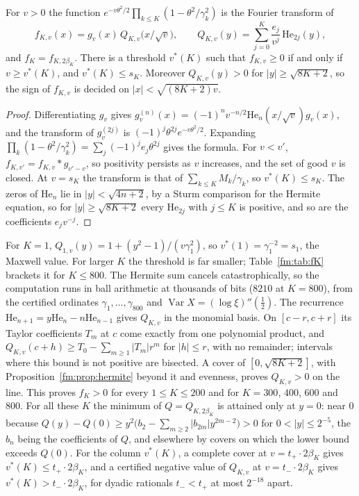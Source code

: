 \begin{proposition}\label{fm:prop:hermite}
For $v>0$ the function $e^{-v\theta^2/2}\prod_{k\le K}(1-\theta^2/\gamma_k^2)$ is the Fourier transform of
\[
f_{K,v}(x)=g_v(x)\,Q_{K,v}\big(x/\sqrt v\big),\qquad Q_{K,v}(y)=\sum_{j=0}^K\frac{e_j}{v^j}\,\mathrm{He}_{2j}(y),
\]
and $f_K=f_{K,2\beta_K}$. There is a threshold $v^*(K)$ such that $f_{K,v}\ge0$ if and only if $v\ge v^*(K)$, and $v^*(K)\le s_K$. Moreover $Q_{K,v}(y)>0$ for $|y|\ge\sqrt{8K+2}$, so the sign of $f_{K,v}$ is decided on $|x|<\sqrt{(8K+2)v}$.
\end{proposition}

\begin{proof}
Differentiating $g_v$ gives $g_v^{(n)}(x)=(-1)^nv^{-n/2}\mathrm{He}_n(x/\sqrt v)g_v(x)$, and the transform of $g_v^{(2j)}$ is $(-1)^j\theta^{2j}e^{-v\theta^2/2}$. Expanding $\prod_k(1-\theta^2/\gamma_k^2)=\sum_j(-1)^je_j\theta^{2j}$ gives the formula. For $v<v'$, $f_{K,v'}=f_{K,v}*g_{v'-v}$, so positivity persists as $v$ increases, and the set of good $v$ is closed. At $v=s_K$ the transform is that of $\sum_{k\le K}M_k/\gamma_k$, so $v^*(K)\le s_K$. The zeros of $\mathrm{He}_n$ lie in $|y|<\sqrt{4n+2}$, by a Sturm comparison for the Hermite equation, so for $|y|\ge\sqrt{8K+2}$ every $\mathrm{He}_{2j}$ with $j\le K$ is positive, and so are the coefficients $e_jv^{-j}$.
\end{proof}

For $K=1$, $Q_{1,v}(y)=1+(y^2-1)/(v\gamma_1^2)$, so $v^*(1)=\gamma_1^{-2}=s_1$, the Maxwell value. For larger $K$ the threshold is far smaller; Table~\ref{fm:tab:fK} brackets it for $K\le800$. The Hermite sum cancels catastrophically, so the computation runs in ball arithmetic \cite{Arb} at thousands of bits ($8210$ at $K=800$), from the certified ordinates $\gamma_1,\dots,\gamma_{800}$ and $\operatorname{Var}X=(\log\xi)''(\frac12)$. The recurrence $\mathrm{He}_{n+1}=y\mathrm{He}_n-n\mathrm{He}_{n-1}$ gives $Q_{K,v}$ in the monomial basis. On $[c-r,c+r]$ its Taylor coefficients $T_m$ at $c$ come exactly from one polynomial product, and $Q_{K,v}(c+h)\ge T_0-\sum_{m\ge1}|T_m|r^m$ for $|h|\le r$, with no remainder; intervals where this bound is not positive are bisected. A cover of $[0,\sqrt{8K+2}]$, with Proposition~\ref{fm:prop:hermite} beyond it and evenness, proves $Q_{K,v}>0$ on the line. This proves $f_K>0$ for every $1\le K\le200$ and for $K=300$, $400$, $600$ and $800$. For all these $K$ the minimum of $Q=Q_{K,2\beta_K}$ is attained only at $y=0$: near $0$ because $Q(y)-Q(0)\ge y^2\big(b_2-\sum_{m\ge2}|b_{2m}|y^{2m-2}\big)>0$ for $0<|y|\le2^{-5}$, the $b_n$ being the coefficients of $Q$, and elsewhere by covers on which the lower bound exceeds $Q(0)$. For the column $v^*(K)$, a complete cover at $v=t_+\cdot2\beta_K$ gives $v^*(K)\le t_+\cdot2\beta_K$, and a certified negative value of $Q_{K,v}$ at $v=t_-\cdot2\beta_K$ gives $v^*(K)>t_-\cdot2\beta_K$, for dyadic rationals $t_-<t_+$ at most $2^{-18}$ apart.

